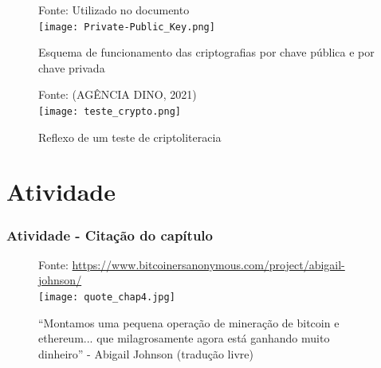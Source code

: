 \documentclass[aspectratio=43,8pt]{beamer}%
\begin{document}
\begin{frame}[noframenumbering]
	\begin{figure}
		\centering
		{\footnotesize Fonte: Utilizado no documento}\\
		\texttt{[image: Private-Public\_Key.png]}
		\caption{Esquema de funcionamento das criptografias por chave pública e por chave privada}
	\end{figure}
\end{frame}
\begin{frame}[noframenumbering]
\begin{figure}
	\centering
	{\footnotesize Fonte: (AGÊNCIA DINO, 2021)}\\
	\texttt{[image: teste\_crypto.png]}
	\caption{Reflexo de um teste de criptoliteracia}
\end{figure}
\end{frame}



\section{Atividade}

\begin{frame}
	\frametitle{Atividade - Citação do capítulo}
	
	\begin{figure}
		\centering
		{\footnotesize Fonte:  \url{https://www.bitcoinersanonymous.com/project/abigail-johnson/}}\\
		\texttt{[image: quote\_chap4.jpg]}
		\caption{``Montamos uma pequena operação de
			mineração de bitcoin e ethereum... que
			milagrosamente agora está ganhando muito
			dinheiro'' - Abigail Johnson
			(tradução livre)}
	\end{figure}
\end{frame}
\end{document}

